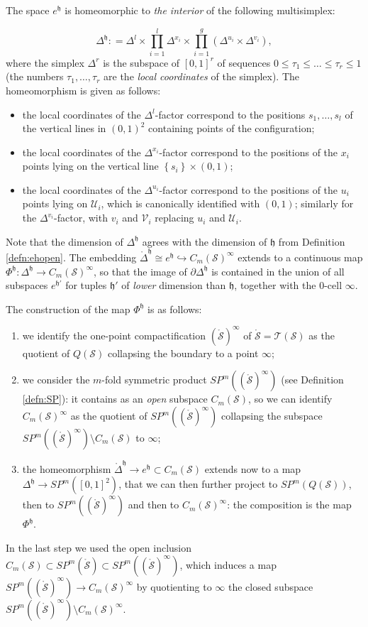 \documentclass{amsart}
\theoremstyle{plain}
\theoremstyle{definition}
\renewcommand{\S}{\mathcal{S}}
\newcommand{\T}{\mathcal{T}}
\newcommand{\U}{\mathcal{U}}
\newcommand{\V}{\mathcal{V}}
\newcommand{\cms}{C_m(\S)}
\newcommand{\tup}{\mathfrak{h}}
\newcommand{\pa}[1]{\left(#1\right)}
\newcommand{\set}[1]{\left\{#1\right\}}
\newcommand{\mrS}{\mathring{\S}}
\newcommand{\SP}{S\!P}
\begin{document}
The space $e^{\tup}$ is homeomorphic to \emph{the interior} of the following multisimplex:

\[
 \Delta^{\tup}\colon =
 \Delta^l\times\prod_{i=1}^l\Delta^{x_i}\times\prod_{i=1}^g\pa{\Delta^{u_i}\times\Delta^{v_i}},
\]
where the simplex $\Delta^r$ is the subspace of $[0,1]^r$ of sequences $0\leq \tau_1\leq\dots\leq\tau_r\leq 1$
(the numbers $\tau_1,\dots,\tau_r$ are the \emph{local coordinates} of the simplex). The homeomorphism is given
as follows:
\begin{itemize}
 \item the local coordinates of the $\Delta^l$-factor correspond to the positions $s_1,\dots,s_l$ of the vertical
 lines in $(0,1)^2$ containing points of the configuration;
 \item the local coordinates of the $\Delta^{x_i}$-factor correspond to the positions of the $x_i$ points
 lying on the vertical line $\set{s_i}\times(0,1)$;
 \item the local coordinates of the $\Delta^{u_i}$-factor correspond to the positions of the $u_i$ points
 lying on $\U_i$, which is canonically identified with $(0,1)$; similarly for the $\Delta^{v_i}$-factor,
 with $v_i$ and $\V_i$ replacing $u_i$ and $\U_i$.
\end{itemize}
Note that the dimension of $\Delta^{\tup}$ agrees with the dimension of $\tup$ from Definition \ref{defn:ehopen}.
The embedding $\mathring{\Delta}^{\tup}\cong e^{\tup}\hookrightarrow \cms^{\infty}$ extends to a continuous map
$\Phi^{\tup}\colon\Delta^{\tup}\to\cms^{\infty}$, so that the image of $\partial\Delta^{\tup}$ is contained in the union of
all subspaces $e^{\tup'}$ for tuples $\tup'$ of \emph{lower} dimension than $\tup$, together with the $0$-cell $\infty$.

The construction of the map $\Phi^{\tup}$ is as follows:
\begin{enumerate}
\item we identify the one-point compactification
$(\mrS)^{\infty}$ of $\mrS=\T(\S)$ as the quotient of $Q(\S)$ collapsing the boundary to a point $\infty$;
\item we consider the $m$-fold symmetric product $\SP^m\pa{(\mrS)^{\infty}}$ (see Definition \ref{defn:SP}): it contains 
as an \emph{open} subspace $\cms$, so we can identify $\cms^{\infty}$ as the quotient of $\SP^m\pa{(\mrS)^{\infty}}$ collapsing
the subspace $\SP^m\pa{(\mrS)^{\infty}}\setminus\cms$ to $\infty$;
\item the homeomorphism $\mathring{\Delta}^{\tup}\to e^{\tup}\subset\cms$ extends
now to a map $\Delta^{\tup}\to\SP^m\pa{[0,1]^2}$, that we can then further project to $\SP^m(Q(\S))$, then to
$ \SP^m\pa{(\mrS)^{\infty}}$ and then to $\cms^{\infty}$: the composition
is the map $\Phi^{\tup}$.
\end{enumerate}
In the last step we used the open inclusion $\cms\subset\SP^m\pa{\mrS}\subset\SP^m\pa{(\mrS)^{\infty}}$, which
induces a map $ \SP^m\pa{(\mrS)^{\infty}}\to\cms^{\infty}$ by quotienting to $\infty$ the closed subspace
$ \SP^m\pa{(\mrS)^{\infty}}\setminus \cms^{\infty}$.
\end{document}

